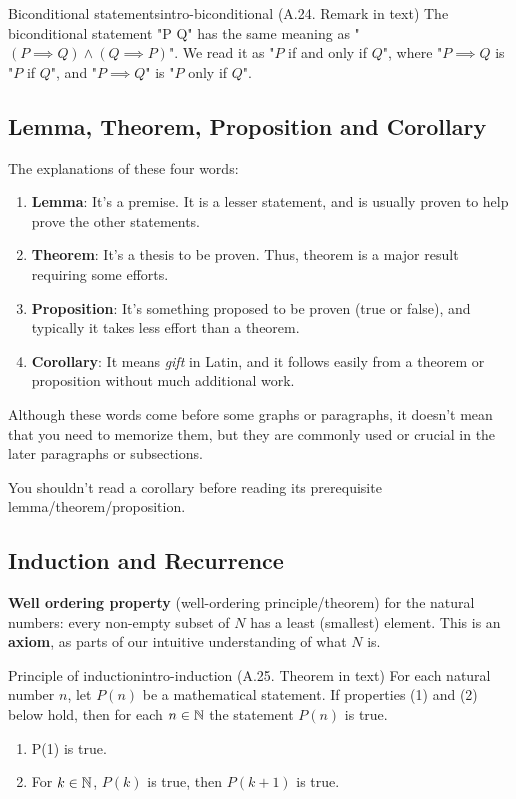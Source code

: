 \documentclass[../src/handouts/main.tex]{subfiles}
\begin{document}
\begin{remark}{Biconditional statements}{intro-biconditional}
  (A.24. Remark in text)
  The biconditional statement "P \iff Q" has the same meaning as "$(P \implies Q) \land (Q \implies P)$". We read it as "$P$ if and only if $Q$", where "$P \implies Q$ is "$P$ if $Q$", and "$P \implies Q$" is "$P$ only if $Q$".
\end{remark}

\subsection{Lemma, Theorem, Proposition and Corollary}

The explanations of these four words:
\begin{enumerate}
  \item \textbf{Lemma}: It's a premise. It is a lesser statement, and is usually proven to help prove the other statements.
  \item \textbf{Theorem}: It's a thesis to be proven. Thus, theorem is a major result requiring some efforts.
  \item \textbf{Proposition}: It's something proposed to be proven (true or false), and typically it takes less effort than a theorem.
  \item \textbf{Corollary}: It means \textit{gift} in Latin, and it follows easily from a theorem or proposition without much additional work.
\end{enumerate}

Although these words come before some graphs or paragraphs, it doesn't mean that you need to memorize them, but they are commonly used or crucial in the later paragraphs or subsections.

You shouldn't read a corollary before reading its prerequisite lemma/theorem/proposition.

\subsection{Induction and Recurrence}

\textbf{Well ordering property} (well-ordering principle/theorem) for the natural numbers: every non-empty subset of $N$ has a least (smallest) element.
This is an \textbf{axiom}, as parts of our intuitive understanding of what $N$ is.

\begin{theorem}{Principle of induction}{intro-induction}
  (A.25. Theorem in text)
  For each natural number $n$, let $P(n)$ be a mathematical statement.
  If properties (1) and (2) below hold, then for each $n \in \mathbb{N}$ the statement $P(n)$ is true.
  \begin{enumerate}
    \item P(1) is true.
    \item For $k \in \mathbb{N}$, $P(k)$ is true, then $P(k + 1)$ is true.
  \end{enumerate}
\end{theorem}
\end{document}
